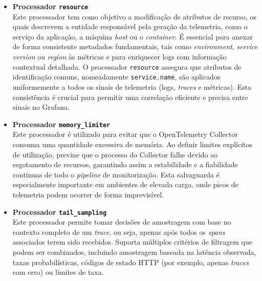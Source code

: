\begin{itemize}
\item \textbf{Processador \texttt{resource}}\\


Este processador tem como objetivo a modificação de atributos de recurso, os quais descrevem a entidade responsável pela geração da telemetria, como o serviço da aplicação, a máquina \textit{host} ou o \textit{container}. É essencial para anexar de forma consistente metadados fundamentais, tais como \textit{environment}, \textit{service version} ou \textit{region} às métricas e para enriquecer logs com informação contextual detalhada. O processador \texttt{resource} assegura que atributos de identificação comuns, nomeadamente \texttt{service.name}, são aplicados uniformemente a todos os sinais de telemetria (logs, \textit{traces} e métricas). Esta consistência é crucial para permitir uma correlação eficiente e precisa entre sinais no Grafana.

\item \textbf{Processador \texttt{memory\_limiter}}\\

Este processador é utilizado para evitar que o OpenTelemetry Collector consuma uma quantidade excessiva de memória. Ao definir limites explícitos de utilização, previne que o processo do Collector falhe devido ao esgotamento de recursos, garantindo assim a estabilidade e a fiabilidade contínuas de todo o \textit{pipeline} de monitorização. Esta salvaguarda é especialmente importante em ambientes de elevada carga, onde picos de telemetria podem ocorrer de forma imprevisível.


\item \textbf{Processador \texttt{tail\_sampling}}\\

Este processador permite tomar decisões de amostragem com base no contexto completo de um \textit{trace}, ou seja, apenas após todos os \textit{spans} associados terem sido recebidos. Suporta múltiplos critérios de filtragem que podem ser combinados, incluindo amostragem baseada na latência observada, taxas probabilísticas, códigos de estado HTTP (por exemplo, apenas \textit{traces} com erro) ou limites de taxa. 


\end{itemize}
